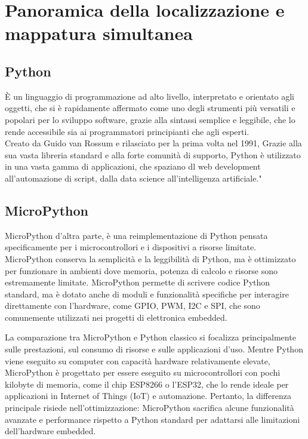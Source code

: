 \documentclass[12pt,a4paper]{report}
\begin{document}
\chapter{Panoramica della localizzazione e mappatura simultanea }

\section{Python}

È un linguaggio di programmazione ad alto livello, interpretato e
orientato agli oggetti, che si è rapidamente affermato come uno degli
strumenti più versatili e popolari per lo sviluppo software, grazie alla
sintassi semplice e leggibile, che lo rende accessibile sia ai
programmatori principianti che agli esperti.\\
Creato da Guido van Rossum e rilasciato per la prima volta nel 1991,
Grazie alla sua vasta libreria standard e alla forte comunità di
supporto, Python è utilizzato in una vasta gamma di applicazioni, che
spaziano dl web development all'automazione di script, dalla data science all'intelligenza artificiale."

\section{MicroPython}

MicroPython d'altra parte, è una reimplementazione di
Python pensata specificamente per i microcontrollori e i dispositivi a
risorse limitate. MicroPython conserva la semplicità e la leggibilità di
Python, ma è ottimizzato per funzionare in ambienti dove memoria,
potenza di calcolo e risorse sono estremamente limitate. MicroPython
permette di scrivere codice Python standard, ma è dotato anche di moduli
e funzionalità specifiche per interagire direttamente con
l'hardware, come GPIO, PWM, I2C e SPI, che sono
comunemente utilizzati nei progetti di elettronica embedded.

La comparazione tra MicroPython e Python classico si focalizza
principalmente sulle prestazioni, sul consumo di risorse e sulle
applicazioni d'uso. Mentre Python viene eseguito su
computer con capacità hardware relativamente elevate, MicroPython è
progettato per essere eseguito su microcontrollori con pochi kilobyte di
memoria, come il chip ESP8266 o l'ESP32, che lo rende
ideale per applicazioni in Internet of Things (IoT) e automazione.
Pertanto, la differenza principale risiede
nell'ottimizzazione: MicroPython sacrifica alcune
funzionalità avanzate e performance rispetto a Python standard per
adattarsi alle limitazioni dell'hardware embedded.
\end{document}
